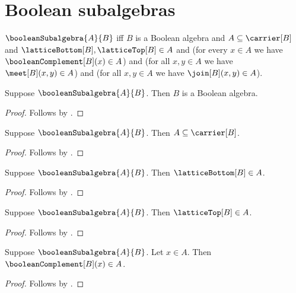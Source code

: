 \section{Boolean subalgebras}






\begin{definition}\label{boolean_subalgebra}
    $\booleanSubalgebra{A}{B}$ iff
        $B$ is a Boolean algebra and
        $A\subseteq\carrier[B]$ and
        $\latticeBottom[B],\latticeTop[B]\in A$ and
        (for every $x\in A$ we have
            $\booleanComplement[B](x)\in A$) and
        (for all $x,y\in A$ we have $\meet[B](x,y)\in A$) and
        (for all $x,y\in A$ we have $\join[B](x,y)\in A$).
\end{definition}

\begin{proposition}\label{boolean_subalgebra_ambient}
    Suppose $\booleanSubalgebra{A}{B}$.
    Then $B$ is a Boolean algebra.
\end{proposition}
\begin{proof}
    Follows by .
\end{proof}

\begin{proposition}\label{boolean_subalgebra_subseteq}
    Suppose $\booleanSubalgebra{A}{B}$.
    Then $A\subseteq\carrier[B]$.
\end{proposition}
\begin{proof}
    Follows by .
\end{proof}

\begin{proposition}\label{boolean_subalgebra_bottom}
    Suppose $\booleanSubalgebra{A}{B}$.
    Then $\latticeBottom[B]\in A$.
\end{proposition}
\begin{proof}
    Follows by .
\end{proof}

\begin{proposition}\label{boolean_subalgebra_top}
    Suppose $\booleanSubalgebra{A}{B}$.
    Then $\latticeTop[B]\in A$.
\end{proposition}
\begin{proof}
    Follows by .
\end{proof}

\begin{proposition}\label{boolean_subalgebra_complement}
    Suppose $\booleanSubalgebra{A}{B}$.
    Let $x\in A$.
    Then $\booleanComplement[B](x)\in A$.
\end{proposition}
\begin{proof}
    Follows by .
\end{proof}

